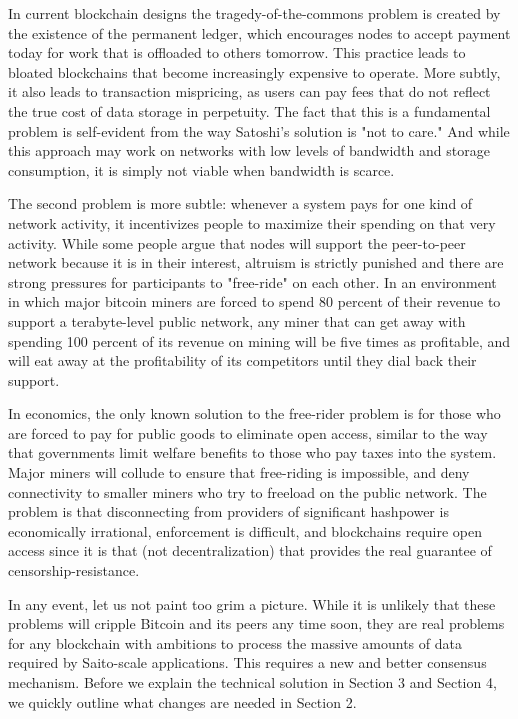 \documentclass[11.5pt, oneside]{article}   	%
\begin{document}
\begin{multicols}{2}
In current blockchain designs the tragedy-of-the-commons problem is created by the existence of the permanent ledger, which encourages nodes to accept payment today for work that is offloaded to others tomorrow. This practice leads to bloated blockchains that become increasingly expensive to operate. More subtly, it also leads to transaction mispricing, as users can pay fees that do not reflect the true cost of data storage in perpetuity. The fact that this is a fundamental problem is self-evident from the way Satoshi's solution is "not to care." And while this approach may work on networks with low levels of bandwidth and storage consumption, it is simply not viable when bandwidth is scarce.

The second problem is more subtle: whenever a system pays for one kind of network activity, it incentivizes people to maximize their spending on that very activity. While some people argue that nodes will support the peer-to-peer network because it is in their interest, altruism is strictly punished and there are strong pressures for participants to "free-ride" on each other. In an environment in which major bitcoin miners are forced to spend 80 percent of their revenue to support a terabyte-level public network, any miner that can get away with spending 100 percent of its revenue on mining will be five times as profitable, and will eat away at the profitability of its competitors until they dial back their support.

In economics, the only known solution to the free-rider problem is for those who are forced to pay for public goods to eliminate open access, similar to the way that governments limit welfare benefits to those who pay taxes into the system. Major miners will collude to ensure that free-riding is impossible, and deny connectivity to smaller miners who try to freeload on the public network. The problem is that disconnecting from providers of significant hashpower is economically irrational, enforcement is difficult, and blockchains require open access since it is that (not decentralization) that provides the real guarantee of censorship-resistance.

In any event, let us not paint too grim a picture. While it is unlikely that these problems will cripple Bitcoin and its peers any time soon, they are real problems for any blockchain with ambitions to process the massive amounts of data required by Saito-scale applications. This requires a new and better consensus mechanism. Before we explain the technical solution in Section 3 and Section 4, we quickly outline what changes are needed in Section 2.


\end{multicols}
\end{document}
